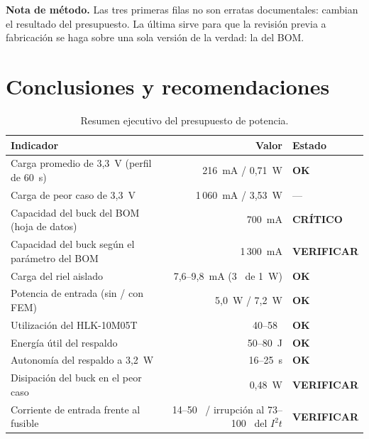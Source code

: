 \documentclass[11pt,a4paper]{article}
\newcommand{\pct}{\text{\char37}}
\newcommand{\ok}{\textcolor{ok}{\textbf{OK}}}
\newcommand{\revisar}{\textcolor{warn}{\textbf{VERIFICAR}}}
\newcommand{\critico}{\textcolor{red!75!black}{\textbf{CRÍTICO}}}
\begin{document}
\noindent \textbf{Nota de método.} Las tres primeras filas no son erratas
documentales: cambian el resultado del presupuesto. La última sirve para que la
revisión previa a fabricación se haga sobre una sola versión de la verdad: la
del BOM.

\section{Conclusiones y recomendaciones}
\label{sec:conclusiones}

\begin{table}[H]
\centering
\caption{Resumen ejecutivo del presupuesto de potencia.}
\label{tab:resumen}
\small
\begin{tabularx}{\textwidth}{@{}X r l@{}}
\toprule
\textbf{Indicador} & \textbf{Valor} & \textbf{Estado} \\
\midrule
Carga promedio de 3,3~V (perfil de 60~s) & 216~mA / 0,71~W & \ok \\
Carga de peor caso de 3,3~V & 1\,060~mA / 3,53~W & --- \\
Capacidad del buck del BOM (hoja de datos) & 700~mA & \critico \\
Capacidad del buck según el parámetro del BOM & 1\,300~mA & \revisar \\
Carga del riel aislado & 7,6--9,8~mA (3~\pct{} de 1~W) & \ok \\
Potencia de entrada (sin / con FEM) & 5,0~W / 7,2~W & \ok \\
Utilización del HLK-10M05T & 40--58~\pct & \ok \\
Energía útil del respaldo & 50--80~J & \ok \\
Autonomía del respaldo a 3,2~W & 16--25~s & \ok \\
Disipación del buck en el peor caso & 0,48~W & \revisar \\
Corriente de entrada frente al fusible & 14--50~\pct{} / irrupción al 73--100~\pct{} del $I^2t$ & \revisar \\
\bottomrule
\end{tabularx}
\end{table}
\end{document}
